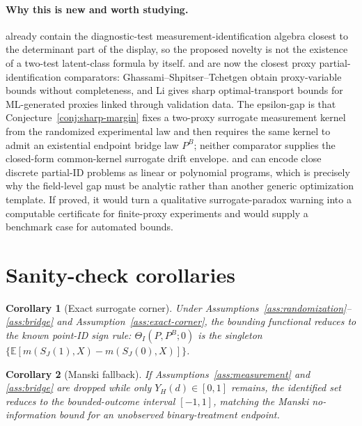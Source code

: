 \documentclass[11pt]{article}
\newcommand{\E}{\mathbb{E}}
\theoremstyle{definition}
\theoremstyle{plain}
\newtheorem{corollary}{Corollary}
\theoremstyle{remark}
\begin{document}
\paragraph{Why this is new and worth studying.}
\citet{HuiWalter1980} already contain the diagnostic-test measurement-identification algebra closest to the determinant part of the display, so the proposed novelty is not the existence of a two-test latent-class formula by itself.  \citet{GhassamiShpitserTchetgen2023} and \citet{Li2026} are now the closest proxy partial-identification comparators: Ghassami--Shpitser--Tchetgen obtain proxy-variable bounds without completeness, and Li gives sharp optimal-transport bounds for ML-generated proxies linked through validation data.  The epsilon-gap is that Conjecture~\ref{conj:sharp-margin} fixes a two-proxy surrogate measurement kernel from the randomized experimental law and then requires the same kernel to admit an existential endpoint bridge law \(P^B\); neither comparator supplies the closed-form common-kernel surrogate drift envelope.  \citet{FinkelsteinAdamsSariaShpitser2021} and \citet{DuarteFinkelsteinKnoxMummoloShpitser2024} can encode close discrete partial-ID problems as linear or polynomial programs, which is precisely why the field-level gap must be analytic rather than another generic optimization template.  If proved, it would turn a qualitative surrogate-paradox warning into a computable certificate for finite-proxy experiments and would supply a benchmark case for automated bounds.

\section{Sanity-check corollaries}
\begin{corollary}[Exact surrogate corner]\label{cor:exact-corner}
Under Assumptions~\ref{ass:randomization}--\ref{ass:bridge} and Assumption~\ref{ass:exact-corner}, the bounding functional reduces to the known point-ID sign rule: \(\Theta_I(P,P^B;0)\) is the singleton \(\{\E[m(S_J(1),X)-m(S_J(0),X)]\}\).
\end{corollary}

\begin{corollary}[Manski fallback]\label{cor:manski}
If Assumptions~\ref{ass:measurement} and \ref{ass:bridge} are dropped while only \(Y_H(d)\in[0,1]\) remains, the identified set reduces to the bounded-outcome interval \([-1,1]\), matching the Manski no-information bound for an unobserved binary-treatment endpoint.
\end{corollary}
\end{document}
